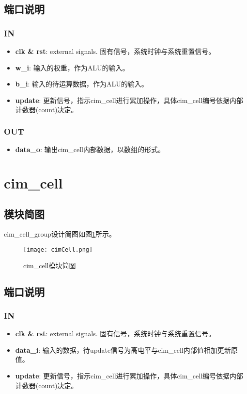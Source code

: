\documentclass[lang=cn,11pt]{elegantpaper}
\begin{document}
\subsection{端口说明}
\subsubsection{IN}
\begin{itemize}
	\item \textbf{clk \& rst}: external signals. 固有信号，系统时钟与系统重置信号。
	\item \textbf{w\_i}: 输入的权重，作为ALU的输入。
	\item \textbf{b\_i}: 输入的待运算数据，作为ALU的输入。
	\item \textbf{update}: 更新信号，指示cim\_cell进行累加操作，具体cim\_cell编号依据内部计数器(count)决定。
\end{itemize}
\subsubsection{OUT}
\begin{itemize}
	\item \textbf{data\_o}: 输出cim\_cell内部数据，以数组的形式。
\end{itemize}

\section{cim\_cell}
\subsection{模块简图}
cim\_cell\_group设计简图如图\ref{cimCell}所示。
\begin{figure}[htbp]
	\centering
	\texttt{[image: cimCell.png]}
	\caption{cim\_cell模块简图}
	\label{cimCell}
\end{figure}
\subsection{端口说明}
\subsubsection{IN}
\begin{itemize}
	\item \textbf{clk \& rst}: external signals. 固有信号，系统时钟与系统重置信号。
	\item \textbf{data\_i}: 输入的数据，待update信号为高电平与cim\_cell内部值相加更新原值。
	\item \textbf{update}: 更新信号，指示cim\_cell进行累加操作，具体cim\_cell编号依据内部计数器(count)决定。
\end{itemize}
\end{document}

